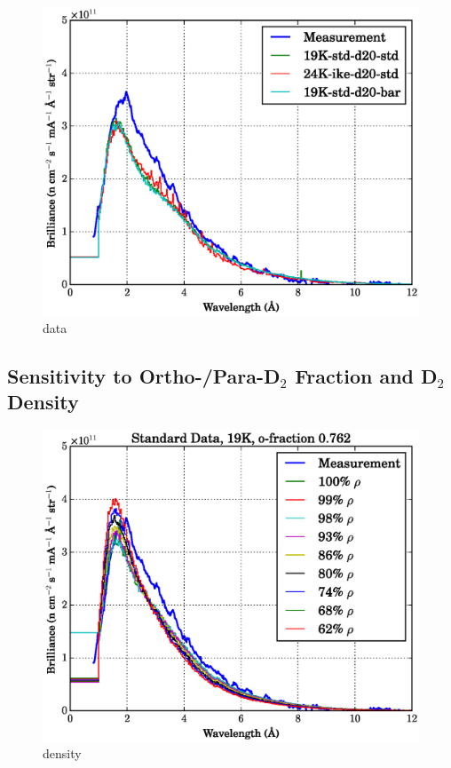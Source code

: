 \documentclass[preprint,12pt]{elsarticle}
\begin{document}
\begin{figure}[h!] 
  \centering
    \includegraphics[width=\columnwidth]{graphics/data_compare.eps}
     \caption{data   \label{fig:data_compare}}
\end{figure}

\subsection{Sensitivity to Ortho-/Para-D$_2$ Fraction and D$_2$ Density}
\label{subsec:frac_den}

\begin{figure}[h!] 
  \centering
    \includegraphics[width=\columnwidth]{graphics/density_compare.eps}
     \caption{density \label{fig:density_compare}}
\end{figure}
\end{document}

